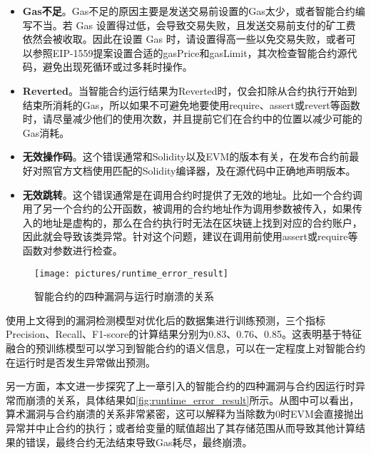 \begin{itemize}
    \item \textbf{Gas不足}。Gas不足的原因主要是发送交易前设置的Gas太少，或者智能合约编写不当。若 Gas 设置得过低，会导致交易失败，且发送交易前支付的矿工费依然会被收取。因此在设置 Gas 时，请设置得高一些以免交易失败，或者可以参照EIP-1559提案\cite{EIP1559}设置合适的gasPrice和gasLimit，其次检查智能合约源代码，避免出现死循环或过多耗时操作。
    \item \textbf{Reverted}。当智能合约运行结果为Reverted时，仅会扣除从合约执行开始到结束所消耗的Gas，所以如果不可避免地要使用require、assert或revert等函数时，请尽量减少他们的使用次数，并且提前它们在合约中的位置以减少可能的Gas消耗。
    \item \textbf{无效操作码}。这个错误通常和Solidity以及EVM的版本有关，在发布合约前最好对照官方文档使用匹配的Solidity编译器，及在源代码中正确地声明版本。
    \item \textbf{无效跳转}。这个错误通常是在调用合约时提供了无效的地址。比如一个合约调用了另一个合约的公开函数，被调用的合约地址作为调用参数被传入，如果传入的地址是虚构的，那么在合约执行时无法在区块链上找到对应的合约账户，因此就会导致该类异常。针对这个问题，建议在调用前使用assert或require等函数对参数进行检查。
\end{itemize}


\begin{figure}[htbp]
    \centering
    \texttt{[image: pictures/runtime\_error\_result]}
    \caption{\label{fig:runtime_error_result}智能合约的四种漏洞与运行时崩溃的关系}
\end{figure}
使用上文得到的漏洞检测模型对优化后的数据集进行训练预测，三个指标Precision、Recall、F1-score的计算结果分别为0.83、0.76、0.85。这表明基于特征融合的预训练模型可以学习到智能合约的语义信息，可以在一定程度上对智能合约在运行时是否发生异常做出预测。

另一方面，本文进一步探究了上一章引入的智能合约的四种漏洞与合约因运行时异常而崩溃的关系，具体结果如\autoref{fig:runtime_error_result}所示。从图中可以看出，算术漏洞与合约崩溃的关系非常紧密，这可以解释为当除数为0时EVM会直接抛出异常并中止合约的执行；或者给变量的赋值超出了其存储范围从而导致其他计算结果的错误，最终合约无法结束导致Gas耗尽，最终崩溃。





